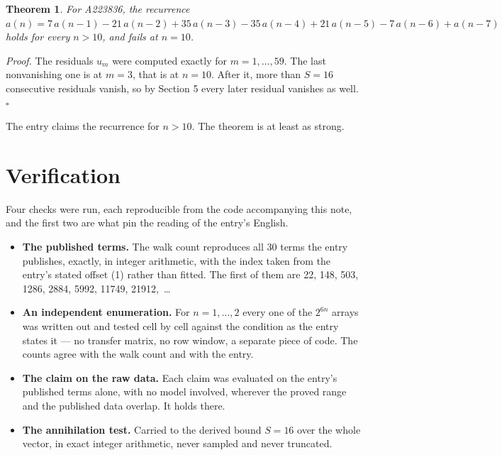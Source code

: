 \documentclass[11pt]{article}
\newtheorem{theorem}{Theorem}
\theoremstyle{definition}
\begin{document}
\begin{theorem} For A223836, the recurrence $a(n) = 7\,a(n-1) - 21\,a(n-2) + 35\,a(n-3) - 35\,a(n-4) + 21\,a(n-5) - 7\,a(n-6) + a(n-7)$ holds for every $n > 10$, and fails at $n = 10$.\end{theorem}

{\itshape Proof.} The residuals $u_m$ were computed exactly for $m = 1,\dots,59$. The last nonvanishing one is at $m = 3$, that is at $n = 10$. After it, more than $S = 16$ consecutive residuals vanish, so by Section 5 every later residual vanishes as well. $\square$

The entry claims the recurrence for $n > 10$. The theorem is at least as strong.

\section{Verification}

Four checks were run, each reproducible from the code accompanying this note, and the first two are what pin the reading of the entry's English.

\begin{itemize}

\item {\bfseries The published terms.} The walk count reproduces all 30 terms the entry publishes, exactly, in integer arithmetic, with the index taken from the entry's stated offset (1) rather than fitted. The first of them are 22, 148, 503, 1286, 2884, 5992, 11749, 21912,~\dots

\item {\bfseries An independent enumeration.} For $n = 1,\dots,2$ every one of the $2^{6n}$ arrays was written out and tested cell by cell against the condition as the entry states it --- no transfer matrix, no row window, a separate piece of code. The counts agree with the walk count and with the entry.

\item {\bfseries The claim on the raw data.} Each claim was evaluated on the entry's published terms alone, with no model involved, wherever the proved range and the published data overlap. It holds there.

\item {\bfseries The annihilation test.} Carried to the derived bound $S = 16$ over the whole vector, in exact integer arithmetic, never sampled and never truncated.

\end{itemize}
\end{document}
